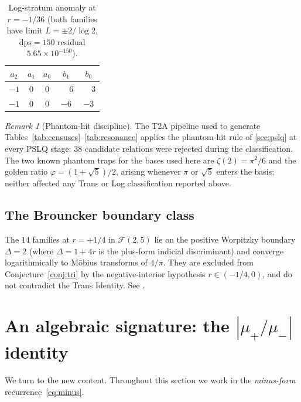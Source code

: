 \documentclass[11pt]{amsart}
\theoremstyle{definition}
\theoremstyle{remark}
\newtheorem{remark}[theorem]{Remark}
\newcommand{\FF}{\mathcal{F}}
\newcommand{\dps}{\mathrm{dps}}
\begin{document}
\begin{table}[t]
\centering
\caption{Log-stratum anomaly at $r=-1/36$
(both families have limit $L=\pm 2/\log 2$, $\dps=150$ residual
$5.65\!\times\!10^{-150}$).}
\label{tab:log-anomaly}
\begin{tabular}{ccccc}
\toprule
$a_2$ & $a_1$ & $a_0$ & $b_1$ & $b_0$ \\
\midrule
$-1$ & $0$ & $0$ & $\phantom{-}6$ & $\phantom{-}3$ \\
$-1$ & $0$ & $0$ & $-6$ & $-3$ \\
\bottomrule
\end{tabular}
\end{table}

\begin{remark}[Phantom-hit discipline]\label{rem:phantom-discipline}
The T2A pipeline used to generate Tables~\ref{tab:censuses}--\ref{tab:resonance}
applies the phantom-hit rule of \textsection\ref{sec:pslq} at every
PSLQ stage: $38$ candidate relations were rejected during the
classification.  The two known phantom traps for the bases used here
are $\zeta(2) = \pi^2/6$ and the golden ratio $\varphi=(1+\sqrt{5})/2$,
arising whenever $\pi$ or $\sqrt 5$ enters the basis; neither affected
any Trans or Log classification reported above.
\end{remark}

\subsection{The Brouncker boundary class}

The $14$ families at $r = +1/4$ in $\FF(2,5)$ lie on the positive
Worpitzky boundary $\Delta = 2$ (where $\Delta = 1+4r$ is the
plus-form indicial discriminant) and converge logarithmically
to M\"obius transforms of $4/\pi$.  They are excluded from
Conjecture~\ref{conj:tri} by the negative-interior hypothesis
$r\in(-1/4,0)$, and do not contradict the Trans Identity.  See
\cite[Theorem~4.1]{TRINote}.

\section{An algebraic signature: the
\texorpdfstring{$|\mu_+/\mu_-|$}{|mu+/mu-|} identity}
\label{sec:signature}

We turn to the new content.  Throughout this section we work in the
\emph{minus-form} recurrence~\eqref{eq:minus}.
\end{document}
